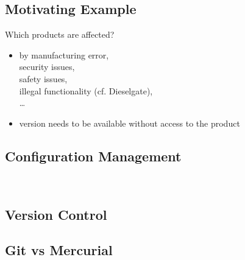 \subsection{Motivating Example}
\begin{frame}{\insertsubsection}
	\begin{fancycolumns}[widths={66}]
	\nextcolumn
		\begin{example}{Which products are affected?}
			\begin{itemize}
				\item by manufacturing error,\\ security issues,\\ safety issues,\\ illegal functionality (cf. Dieselgate),\\ \ldots{}
				\item version needs to be available without access to the product
			\end{itemize}
		\end{example}
	\end{fancycolumns}
\end{frame}

\subsection{Configuration Management}
\begin{frame}{\insertsubsection\ \mytitlesource{\sommerville}}
	\slideConfigManagement
\end{frame}

\subsection{Version Control}
\begin{frame}{\insertsubsection}
	\slideVersionControl
\end{frame}

\subsection{Git vs Mercurial}
\begin{frame}{\insertsubsection}
	\begin{fancycolumns}[animation=none]
		\nextcolumn
	\end{fancycolumns}
\end{frame}

